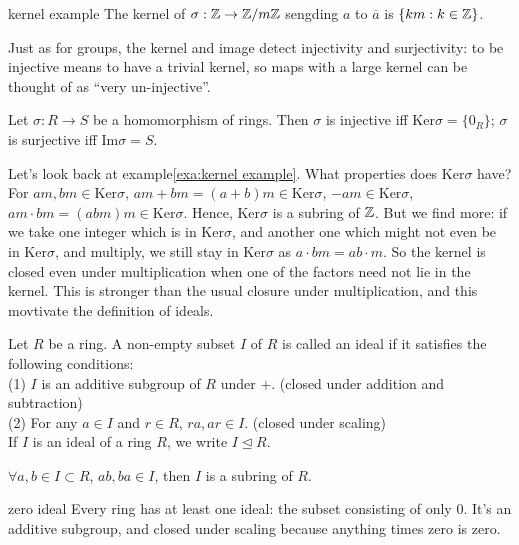 \begin{example}{}{kernel example}
    The kernel of $\sigma:\mathbb{Z}\rightarrow \mathbb{Z}/m\mathbb{Z}$ sengding $a$ to $\overline{a}$ is $\{km:k\in\mathbb{Z}\}$.
\end{example}

Just as for groups, the kernel and image detect injectivity and surjectivity: to be injective means to
have a trivial kernel, so maps with a large kernel can be thought of as “very un-injective”.

\begin{proposition}{}{}    Let $\sigma:R\rightarrow S$ be a homomorphism of rings. Then $\sigma$ is injective iff $\text{Ker}\sigma = \{0_R\}$;
    $\sigma$ is surjective iff $\text{Im}\sigma = S$.
\end{proposition}

Let's look back at example\ref{exa:kernel example}. 
What properties does $\text{Ker}\sigma$ have? For $am,bm\in \text{Ker}\sigma$, $am + bm= (a+b)m\in \text{Ker}\sigma$, $-am\in \text{Ker}\sigma$, $am\cdot bm=(abm)m\in\text{Ker}\sigma$.
Hence, $\text{Ker}\sigma$ is a subring of $\mathbb{Z}$.
But we find more:  if we take one integer which is in $\text{Ker}\sigma$, and another one which might
not even be in $\text{Ker}\sigma$, and multiply, we still stay in $\text{Ker}\sigma$ as $a\cdot bm = ab \cdot m$. 
So the kernel is closed even under multiplication when one of the factors need
not lie in the kernel. This is stronger than the usual closure under multiplication, and this movtivate the definition of ideals.

\begin{definition}{}{}
    Let $R$ be a ring. A non-empty subset $I$ of $R$ is called an ideal if it satisfies the following conditions:\\
    (1) $I$ is an additive subgroup of $R$ under $+$. (closed under addition and subtraction)\\
    (2) For any $a\in I$ and $r\in R$, $ra,ar\in I$. (closed under scaling)\\
    If $I$ is an ideal of a ring $R$, we write $I\unlhd R$.
\end{definition}
\begin{remark}
    $\forall a,b\in I\subset R$, $ab,ba\in I$, then $I$ is a subring of $R$.
\end{remark}




\begin{example}{}{zero ideal}
    Every ring has at least one ideal: the subset consisting of only $0$. It's an additive
subgroup, and closed under scaling because anything times zero is zero. 
\end{example}

